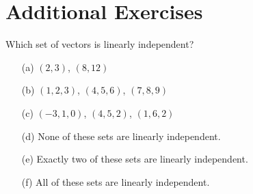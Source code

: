 \newpage\section{Additional Exercises}

\begin{problem}
    Which set of vectors is linearly independent?
    \begin{enumerate}
        \item[(a)] $(2,3)$, $(8,12)$
        \item[(b)] $(1,2,3)$, $(4,5,6)$, $(7,8,9)$
        \item[(c)] $(-3,1,0)$, $(4,5,2)$, $(1,6,2)$
        \item[(d)] None of these sets are linearly independent.
        \item[(e)] Exactly two of these sets are linearly independent.
        \item[(f)] All of these sets are linearly independent.
    \end{enumerate}
\end{problem}

